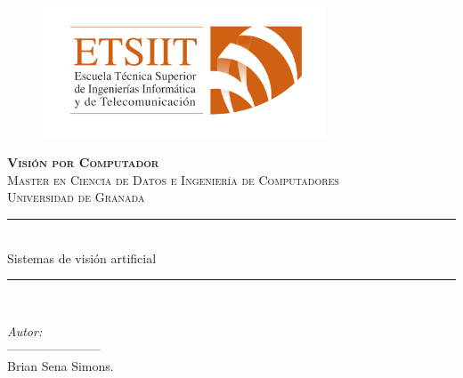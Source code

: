 \documentclass[12pt,letterpaper]{article}
\author{Brian Sena Simons} %
\date{\normalsize\today} %
\newcommand{\horrule}[1]{\rule{\linewidth}{#1}} %
\begin{document}
%
\begin{titlepage}
\begin{figure}[H]
    \vspace{-1.3cm}
    \begin{center}
        \includegraphics[width=0.75\textwidth]{Etsiit}
    \end{center}
\end{figure}
\vspace{1.3cm}
\centering
\normalfont \normalsize
\textsc{\textbf{Visión por Computador} \\ \vspace{.15cm} Master en Ciencia de Datos e Ingeniería de Computadores \\ \vspace{.15cm} Universidad de Granada} \\ [25pt] %
    \horrule{0.5pt} \\[0.4cm] %
    \huge Sistemas de visión artificial\\ %
    \horrule{2pt} \\[0.5cm] %

\begin{minipage}{0.4\textwidth}
    \begin{flushleft}\large
        \emph{Autor:} \\
         ----------------------- \\
        \vspace{.15cm}
        Brian Sena Simons. \\

    \end{flushleft}
\end{minipage}
\begin{minipage}{0.4\textwidth}
    \vspace{-2.2cm}
     \begin{flushright}\large
    \end{flushright}
\end{minipage}
\end{titlepage}
\end{document}
